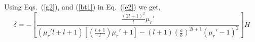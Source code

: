 Using Eqs.~(\ref{g2}), and (\ref{bt1}) in Eq.~(\ref{e2}) we get,
\begin{equation}\label{dt1}
\delta =-\left[\frac{\frac{(2l+1)^2}{l}\mu_r'}{(\mu_r'l+l+1)\left[\left(\frac{l+1}{l}\right)\mu_r'+1\right]-(l+1)\left(\frac{a}{b}\right)^{2l+1}(\mu_r'-1)^2}\right]H    
\end{equation}



